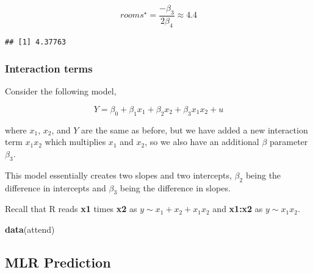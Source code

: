 \documentclass[]{book}
\newenvironment{Shaded}{\begin{snugshade}}{\end{snugshade}}
\newcommand{\DecValTok}[1]{\textcolor[rgb]{0.00,0.00,0.81}{#1}}
\newcommand{\KeywordTok}[1]{\textcolor[rgb]{0.13,0.29,0.53}{\textbf{#1}}}
\newcommand{\NormalTok}[1]{#1}
\newcommand{\OperatorTok}[1]{\textcolor[rgb]{0.81,0.36,0.00}{\textbf{#1}}}
\newcommand{\StringTok}[1]{\textcolor[rgb]{0.31,0.60,0.02}{#1}}
\begin{document}
\begin{equation}
rooms^{\star} = \frac{-\beta_3}{2\beta_4} \approx 4.4
\end{equation}

\begin{Shaded}
\end{Shaded}

\begin{verbatim}
## [1] 4.37763
\end{verbatim}

\hypertarget{interaction-terms}{%
\subsubsection{Interaction terms}\label{interaction-terms}}

Consider the following model,

\begin{equation}
Y = {\beta}_{0} + {\beta}_{1}x_{1} +  {\beta}_{2}x_{2} + {\beta}_{3}x_{1}x_{2} + u    
\label{eq:interactionterm}
\end{equation}

where \(x_1\), \(x_2\), and \(Y\) are the same as before, but we have added a new interaction term \(x_1x_2\) which multiplies \(x_1\) and \(x_2\), so we also have an additional \(\beta\) parameter \(\beta_3\).

This model essentially creates two slopes and two intercepts, \(\beta_2\) being the difference in intercepts and \(\beta_3\) being the difference in slopes.

Recall that R reads \textbf{x1} times \textbf{x2} as \(y \sim x_1+x_2+x_1x_2\) and \textbf{x1:x2} as \(y \sim x_1x_2\).

\begin{Shaded}
\begin{Highlighting}[]
\KeywordTok{data}\NormalTok{(attend)}
\end{Highlighting}
\end{Shaded}

\hypertarget{mlr-prediction}{%
\subsection{MLR Prediction}\label{mlr-prediction}}
\end{document}
